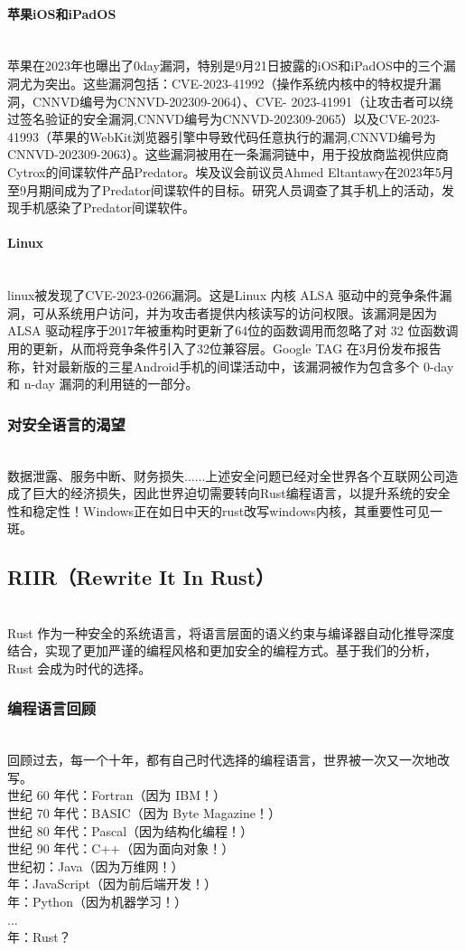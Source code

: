 \paragraph{苹果iOS和iPadOS}\ \\
\indent 苹果在2023年也曝出了0day漏洞，特别是9月21日披露的iOS和iPadOS中的三个漏洞尤为突出。这些漏洞包括：CVE-2023-41992（操作系统内核中的特权提升漏洞，CNNVD编号为CNNVD-202309-2064）、CVE- 2023-41991（让攻击者可以绕过签名验证的安全漏洞,CNNVD编号为CNNVD-202309-2065）以及CVE-2023-41993（苹果的WebKit浏览器引擎中导致代码任意执行的漏洞,CNNVD编号为CNNVD-202309-2063）。这些漏洞被用在一条漏洞链中，用于投放商监视供应商Cytrox的间谍软件产品Predator。埃及议会前议员Ahmed Eltantawy在2023年5月至9月期间成为了Predator间谍软件的目标。研究人员调查了其手机上的活动，发现手机感染了Predator间谍软件。
\paragraph{Linux}\ \\
\indent linux被发现了CVE-2023-0266漏洞。这是Linux 内核 ALSA 驱动中的竞争条件漏洞，可从系统用户访问，并为攻击者提供内核读写的访问权限。该漏洞是因为 ALSA 驱动程序于2017年被重构时更新了64位的函数调用而忽略了对 32 位函数调用的更新，从而将竞争条件引入了32位兼容层。Google TAG 在3月份发布报告称，针对最新版的三星Android手机的间谍活动中，该漏洞被作为包含多个 0-day 和 n-day 漏洞的利用链的一部分。
\subsubsection{对安全语言的渴望}\ \\
\indent 数据泄露、服务中断、财务损失......上述安全问题已经对全世界各个互联网公司造成了巨大的经济损失，因此世界迫切需要转向Rust编程语言，以提升系统的安全性和稳定性！Windows正在如日中天的rust改写windows内核，其重要性可见一斑。
\subsection{RIIR（Rewrite It In Rust）}\ \\
Rust 作为一种安全的系统语言，将语言层面的语义约束与编译器自动化推导深度结合，实现了更加严谨的编程风格和更加安全的编程方式。基于我们的分析，Rust 会成为时代的选择。
\subsubsection{编程语言回顾}\ \\
\indent 回顾过去，每一个十年，都有自己时代选择的编程语言，世界被一次又一次地改写。\\
 世纪 60 年代：Fortran（因为 IBM！）\\
 世纪 70 年代：BASIC（因为 Byte Magazine！） \\
 世纪 80 年代：Pascal（因为结构化编程！） \\
 世纪 90 年代：C++（因为面向对象！） \\
 世纪初：Java（因为万维网！） \\
 年：JavaScript（因为前后端开发！） \\
 年：Python（因为机器学习！） \\
\indent ... \\
 年：Rust？
